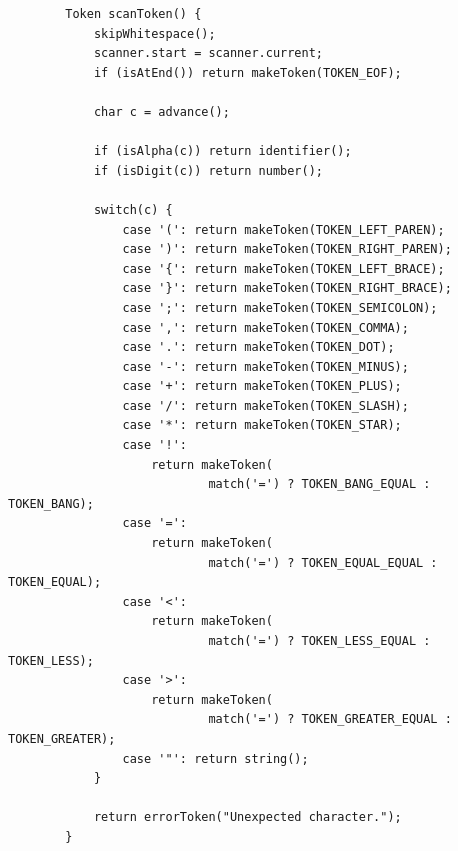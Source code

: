 	\begin{lstlisting}
		Token scanToken() {
			skipWhitespace();
			scanner.start = scanner.current;
			if (isAtEnd()) return makeToken(TOKEN_EOF); 

			char c = advance(); 
			
			if (isAlpha(c)) return identifier();
			if (isDigit(c)) return number();

			switch(c) {
				case '(': return makeToken(TOKEN_LEFT_PAREN);
				case ')': return makeToken(TOKEN_RIGHT_PAREN);
				case '{': return makeToken(TOKEN_LEFT_BRACE);
				case '}': return makeToken(TOKEN_RIGHT_BRACE);
				case ';': return makeToken(TOKEN_SEMICOLON);
				case ',': return makeToken(TOKEN_COMMA);
				case '.': return makeToken(TOKEN_DOT);
				case '-': return makeToken(TOKEN_MINUS);
				case '+': return makeToken(TOKEN_PLUS);
				case '/': return makeToken(TOKEN_SLASH);
				case '*': return makeToken(TOKEN_STAR);
				case '!':
					return makeToken(
							match('=') ? TOKEN_BANG_EQUAL : TOKEN_BANG);
				case '=':
					return makeToken(
							match('=') ? TOKEN_EQUAL_EQUAL : TOKEN_EQUAL);
				case '<':
					return makeToken(
							match('=') ? TOKEN_LESS_EQUAL : TOKEN_LESS);
				case '>':
					return makeToken(
							match('=') ? TOKEN_GREATER_EQUAL : TOKEN_GREATER);
				case '"': return string();
			}

			return errorToken("Unexpected character.");
		}
	\end{lstlisting}

